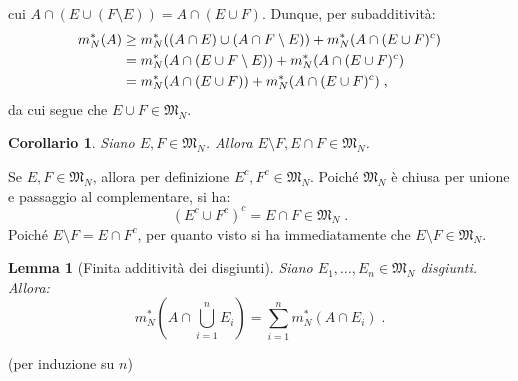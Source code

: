 \documentclass[a4paper,12pt]{report}
\theoremstyle{plain}
\newtheorem{cor}{Corollario}[thm]
\newtheorem{lem}{Lemma}[section]
\theoremstyle{definition}
\theoremstyle{remark}
\numberwithin{equation}{section}
\begin{document}
cui $A\cap(E\cup(F\setminus E))=A \cap (E\cup F)$. Dunque, per subadditività:
\begin{align}
m_N^*(A) &\ge m_N^*((A\cap E)\cup(A\cap F\setminus E))+m_N^*(A\cap(E\cup F)^c) \notag \\
&=m_N^*(A\cap(E\cup F\setminus E))+m_N^*(A\cap(E\cup F)^c) \notag \\
&=m_N^*(A\cap(E\cup F))+m_N^*(A\cap(E\cup F)^c)\;,
\end{align}
da cui segue che $E\cup F \in \mathfrak{M}_N$.
\endproof
\begin{cor} Siano $E,F \in \mathfrak{M}_N$. Allora $E\setminus F, E\cap F \in \mathfrak{M}_N$.
\end{cor}
\proof Se $E,F \in \mathfrak{M}_N$, allora per definizione $E^c,F^c \in \mathfrak{M}_N$. Poiché $\mathfrak{M}_N$ è chiusa per unione e passaggio al complementare, si ha:
\begin{equation}
\left(E^c\cup F^c\right)^{c}=E\cap F \in \mathfrak{M}_N\;.
\end{equation}
Poiché $E \setminus F=E \cap F^c$, per quanto visto si ha immediatamente che $E \setminus F \in \mathfrak{M}_N$.
\endproof
\begin{lem}[Finita additività dei disgiunti] Siano $E_1,\ldots,E_n \in \mathfrak{M}_N$ disgiunti. Allora:
\begin{equation}
m_N^*\left(A\cap \bigcup_{i=1}^n E_i\right)=\sum_{i=1}^n m_N^*(A\cap E_i)\;.
\end{equation}
\end{lem}
\proof (per induzione su $n$) \\
\end{document}
